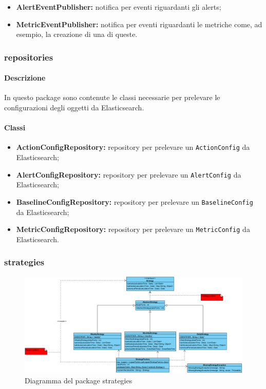 		\begin{itemize}
			\item \textbf{AlertEventPublisher:} notifica per eventi riguardanti gli alerts;
			\item \textbf{MetricEventPublisher:} notifica per eventi riguardanti le metriche come,
				ad esempio, la creazione di una di queste.
		\end{itemize}
		
	\subsubsection{repositories}
		
		\paragraph*{Descrizione}
			In questo package sono contenute le classi necessarie per prelevare le configurazioni
			degli oggetti da Elasticsearch.
		
		\paragraph*{Classi}
			
			\begin{itemize}
				\item \textbf{ActionConfigRepository:} repository per prelevare un \verb=ActionConfig= 
					da Elasticsearch;
				\item \textbf{AlertConfigRepository:} repository per prelevare un \verb=AlertConfig= 
					da Elasticsearch;
				\item \textbf{BaselineConfigRepository:} repository per prelevare un \verb=BaselineConfig= 
					da Elasticsearch;
				\item \textbf{MetricConfigRepository:} repository per prelevare un \verb=MetricConfig= 
					da Elasticsearch.
			\end{itemize}

\newpage

	\subsubsection{strategies}
	

		\begin{figure}[H]
           	\centering
            \includegraphics[width=\textwidth]{./img/DiagrammiClasse/Strategies.png}
            \caption[Diagramma del package strategies]{Diagramma del package strategies}
       	\end{figure}
		
